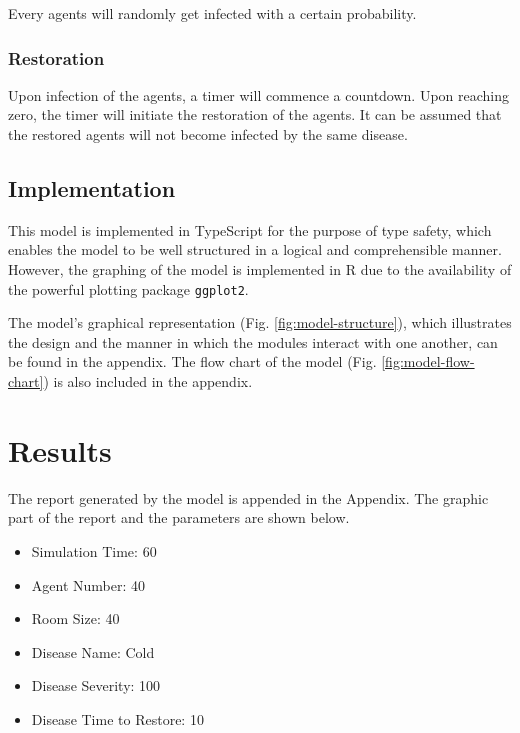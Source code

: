 \documentclass[12pt]{article}
\begin{document}
Every agents will randomly get infected with a certain probability.

\subsubsection{Restoration}

Upon infection of the agents, a timer will commence a countdown. Upon reaching zero, the timer will initiate the restoration of the agents. It can be assumed that the restored agents will not become infected by the same disease.

\subsection{Implementation}

This model is implemented in TypeScript for the purpose of type safety, which enables the model to be well structured in a logical and comprehensible manner. However, the graphing of the model is implemented in R due to the availability of the powerful plotting package  \texttt{ggplot2}.

The model's graphical representation (Fig. \ref{fig:model-structure}), which illustrates the design and the manner in which the modules interact with one another, can be found in the appendix.
The flow chart of the model (Fig. \ref{fig:model-flow-chart}) is also included in the appendix.

\section{Results}
The report generated by the model is appended in the Appendix. The graphic part of the report and the parameters are shown below.

\begin{itemize}
    \item Simulation Time: 60
    \item Agent Number: 40
    \item Room Size: 40
\end{itemize}


\begin{itemize}
	\item Disease Name: Cold
	\item Disease Severity: 100
	\item Disease Time to Restore: 10
\end{itemize}
\end{document}
